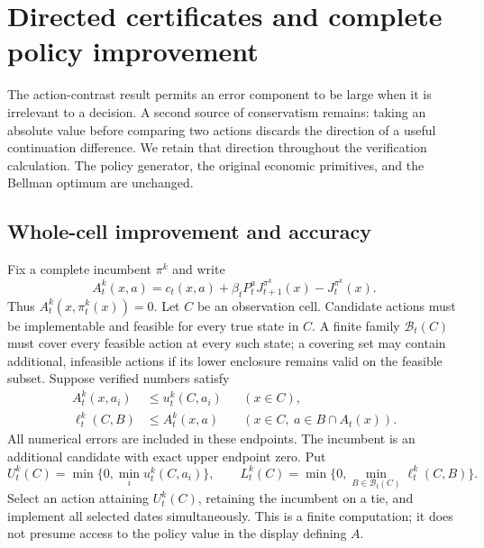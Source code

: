 \section{Directed certificates and complete policy improvement}\label{sec:directed54}
The action-contrast result permits an error component to be large when it is irrelevant to a decision. A second source of conservatism remains: taking an absolute value before comparing two actions discards the direction of a useful continuation difference. We retain that direction throughout the verification calculation. The policy generator, the original economic primitives, and the Bellman optimum are unchanged.

\subsection{Whole-cell improvement and accuracy}
Fix a complete incumbent $\pi^k$ and write
\[
 A_t^k(x,a)=c_t(x,a)+\beta_t P_t^aJ_{t+1}^{\pi^k}(x)
                       -J_t^{\pi^k}(x).
\]
Thus $A_t^k(x,\pi_t^k(x))=0$. Let $C$ be an observation cell. Candidate actions must be implementable and feasible for every true state in $C$. A finite family $\mathcal B_t(C)$ must cover every feasible action at every such state; a covering set may contain additional, infeasible actions if its lower enclosure remains valid on the feasible subset. Suppose verified numbers satisfy
\begin{align*}
 A_t^k(x,a_i)&\le u_t^k(C,a_i) &&(x\in C),\\
 \ell_t^k(C,B)&\le A_t^k(x,a) &&(x\in C,\ a\in B\cap A_t(x)).
\end{align*}
All numerical errors are included in these endpoints. The incumbent is an additional candidate with exact upper endpoint zero. Put
\begin{equation}\label{eq:directed-selection54}
 U_t^k(C)=\min\{0,\min_i u_t^k(C,a_i)\},\qquad
 L_t^k(C)=\min\{0,\min_{B\in\mathcal B_t(C)}\ell_t^k(C,B)\}.
\end{equation}
Select an action attaining $U_t^k(C)$, retaining the incumbent on a tie, and implement all selected dates simultaneously. This is a finite computation; it does not presume access to the policy value in the display defining $A$.

